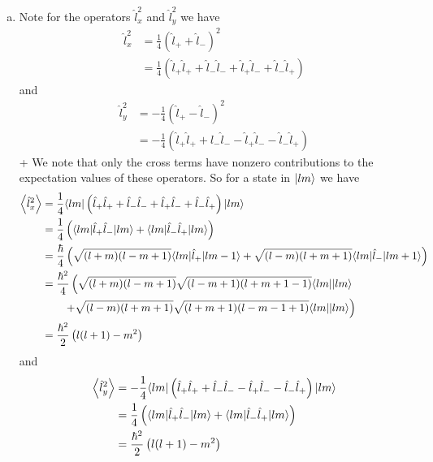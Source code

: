 \documentclass[11pt]{article}
\numberwithin{equation}{section}
\begin{document}
\begin{enumerate}[(a)]
\item Note for the operators $\hat{l}^2_{x}$ and $\hat{l}^2_{y}$ we have
\begin{align*}
\hat{l}_x^2 &= \frac{1}{4}\left(\hat{l}_{+}+\hat{l}_{-}\right)^2\\
&= \frac{1}{4}\left(\hat{l}_{+}\hat{l}_{+} + \hat{l}_{-}\hat{l}_{-} + \hat{l}_{+}\hat{l}_{-} +\hat{l}_{-}\hat{l}_{+}\right)
\end{align*}
and
\begin{align*}
\hat{l}_y^2 &= -\frac{1}{4}\left(\hat{l}_{+}-\hat{l}_{-}\right)^2\\
&= -\frac{1}{4}\left(\hat{l}_{+}\hat{l}_{+} + \hat{l}_{-}\hat{l}_{-} - \hat{l}_{+}\hat{l}_{-} - \hat{l}_{-}\hat{l}_{+}\right)
\end{align*}+
We note that only the cross terms have nonzero contributions to the expectation values of
these operators. So for a state in $|{lm}\rangle$ we have
\begin{align*}
\left\langle\hat{l}_x^2\right\rangle &= \frac{1}{4}\langle{lm}|\left(\hat{l}_{+}\hat{l}_{+} + \hat{l}_{-}\hat{l}_{-} + \hat{l}_{+}\hat{l}_{-} + \hat{l}_{-}\hat{l}_{+}\right)|{lm}\rangle\\
&= \frac{1}{4}\left(\langle{lm}|\hat{l}_{+}\hat{l}_{-}|{lm}\rangle + \langle{lm}|\hat{l}_{-}\hat{l}_{+}|{lm}\rangle\right)\\
&= \frac{\hbar}{4}\left(\sqrt{(l+m)(l-m+1)}\langle{lm}|\hat{l}_{+}|{lm-1}\rangle + \sqrt{(l-m)(l+m+1)}\langle{lm}|\hat{l}_{-}|{lm+1}\rangle\right)\\
&= \frac{\hbar^2}{4}\left(\sqrt{(l+m)(l-m+1)}\sqrt{(l-m+1)(l+m+1-1)}\langle{lm}||{lm}\rangle\right.\\
&\qquad\left. + \sqrt{(l-m)(l+m+1)}\sqrt{(l+m+1)(l-m-1+1)}\langle{lm}||{lm}\rangle\right)\\
&= \frac{\hbar^2}{2}\left(l(l+1)-m^2\right)
\end{align*}
and
\begin{align*}
\left\langle\hat{l}_y^2\right\rangle &= -\frac{1}{4}\langle{lm}|\left(\hat{l}_{+}\hat{l}_{+} + \hat{l}_{-}\hat{l}_{-} - \hat{l}_{+}\hat{l}_{-} - \hat{l}_{-}\hat{l}_{+}\right)|{lm}\rangle\\
&= \frac{1}{4}\left(\langle{lm}|\hat{l}_{+}\hat{l}_{-}|{lm}\rangle + \langle{lm}|\hat{l}_{-}\hat{l}_{+}|{lm}\rangle\right)\\
&= \frac{\hbar^2}{2}\left(l(l+1)-m^2\right)
\end{align*}
\end{enumerate}

\pagebreak
\end{document}
